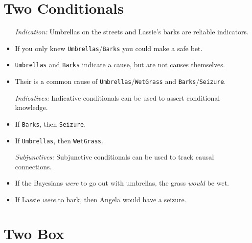 \documentclass[a4paper, 11pt]{article} %
\begin{document}
\section*{Two Conditionals}

\begin{itemize}
  \item[\it Indication:] Umbrellas on the streets and Lassie's barks are reliable indicators.
    \item If you only knew \texttt{Umbrellas}/\texttt{Barks} you could make a safe bet.
    \item \texttt{Umbrellas} and \texttt{Barks} indicate a cause, but are not causes themselves.
    \item Their is a common cause of \texttt{Umbrellas}/\texttt{WetGrass} and \texttt{Barks}/\texttt{Seizure}.
  \item[\it Indicatives:] Indicative conditionals can be used to assert conditional knowledge.
    \item If \texttt{Barks}, then \texttt{Seizure}.
    \item If \texttt{Umbrellas}, then \texttt{WetGrass}.
  \item[\it Subjunctives:] Subjunctive conditionals can be used to track causal connections.
    \item If the Bayesians \textit{were} to go out with umbrellas, the grass \textit{would} be wet.
    \item If Lassie \textit{were} to bark, then Angela would have a seizure.
\end{itemize}


\section*{Two Box}
\end{document}
